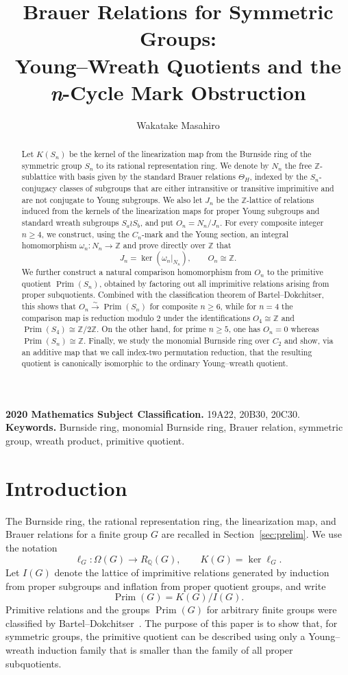 \documentclass[a4paper,11pt]{article}
\title{Brauer Relations for Symmetric Groups:\\
Young--Wreath Quotients and the \textit{n}-Cycle Mark Obstruction}
\author{Wakatake Masahiro}
\date{}
\numberwithin{equation}{section}
\newcommand{\Q}{\mathbb{Q}}
\newcommand{\Z}{\mathbb{Z}}
\newcommand{\Prim}{\operatorname{Prim}}
\begin{document}
\maketitle

\begin{abstract}
Let $K(S_n)$ be the kernel of the linearization map from the Burnside ring of the symmetric group $S_n$ to its rational representation ring.  We denote by $N_n$ the free $\mathbb Z$-sublattice with basis given by the standard Brauer relations $\Theta_H$, indexed by the $S_n$-conjugacy classes of subgroups that are either intransitive or transitive imprimitive and are not conjugate to Young subgroups.  We also let $J_n$ be the $\mathbb Z$-lattice of relations induced from the kernels of the linearization maps for proper Young subgroups and standard wreath subgroups $S_a\wr S_b$, and put $O_n=N_n/J_n$.  For every composite integer $n\ge4$, we construct, using the $C_n$-mark and the Young section, an integral homomorphism $\omega_n:N_n\to\Z$ and prove directly over $\mathbb Z$ that
\[
  J_n=\ker(\omega_n|_{N_n}),\qquad O_n\cong\Z.
\]
We further construct a natural comparison homomorphism from $O_n$ to the primitive quotient $\Prim(S_n)$, obtained by factoring out all imprimitive relations arising from proper subquotients.  Combined with the classification theorem of Bartel--Dokchitser, this shows that $O_n\xrightarrow{\sim}\Prim(S_n)$ for composite $n\ge6$, while for $n=4$ the comparison map is reduction modulo $2$ under the identifications $O_4\cong\Z$ and $\Prim(S_4)\cong\Z/2\Z$.  On the other hand, for prime $n\ge5$, one has $O_n=0$ whereas $\Prim(S_n)\cong\Z$.  Finally, we study the monomial Burnside ring over $C_2$ and show, via an additive map that we call index-two permutation reduction, that the resulting quotient is canonically isomorphic to the ordinary Young--wreath quotient.
\end{abstract}

\begin{center}
\small
\textbf{2020 Mathematics Subject Classification.}
19A22, 20B30, 20C30.\qquad
\textbf{Keywords.}
Burnside ring, monomial Burnside ring, Brauer relation, symmetric group, wreath product, primitive quotient.
\end{center}

\section{Introduction}

The Burnside ring, the rational representation ring, the linearization map, and Brauer relations for a finite group $G$ are recalled in Section~\ref{sec:prelim}. We use the notation
\[
  \ell_G:\Omega(G)\longrightarrow R_{\Q}(G),\qquad
  K(G)=\ker\ell_G.
\]
Let $I(G)$ denote the lattice of imprimitive relations generated by induction from proper subgroups and inflation from proper quotient groups, and write
\[
  \Prim(G)=K(G)/I(G).
\]
Primitive relations and the groups $\Prim(G)$ for arbitrary finite groups were classified by Bartel--Dokchitser~\cite{BartelDokchitserBrauer}. The purpose of this paper is to show that, for symmetric groups, the primitive quotient can be described using only a Young--wreath induction family that is smaller than the family of all proper subquotients.
\end{document}
